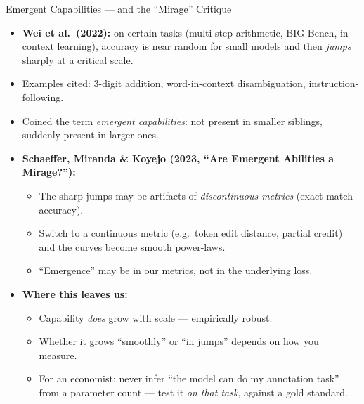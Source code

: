 \begin{frame}{Emergent Capabilities --- and the ``Mirage'' Critique}
\begin{itemize}
\item \textbf{Wei et al.\ (2022):} on certain tasks (multi-step arithmetic, BIG-Bench, in-context learning), accuracy is near random for small models and then \emph{jumps} sharply at a critical scale.
\item Examples cited: 3-digit addition, word-in-context disambiguation, instruction-following.
\item Coined the term \emph{emergent capabilities}: not present in smaller siblings, suddenly present in larger ones.

\medskip
\item \textbf{Schaeffer, Miranda \& Koyejo (2023, ``Are Emergent Abilities a Mirage?''):}
\begin{itemize}
\item The sharp jumps may be artifacts of \emph{discontinuous metrics} (exact-match accuracy).
\item Switch to a continuous metric (e.g.\ token edit distance, partial credit) and the curves become smooth power-laws.
\item ``Emergence'' may be in our metrics, not in the underlying loss.
\end{itemize}

\medskip
\item \textbf{Where this leaves us:}
\begin{itemize}
\item Capability \emph{does} grow with scale --- empirically robust.
\item Whether it grows ``smoothly'' or ``in jumps'' depends on how you measure.
\item For an economist: never infer ``the model can do my annotation task'' from a parameter count --- test it \emph{on that task}, against a gold standard.
\end{itemize}
\end{itemize}
\end{frame}

